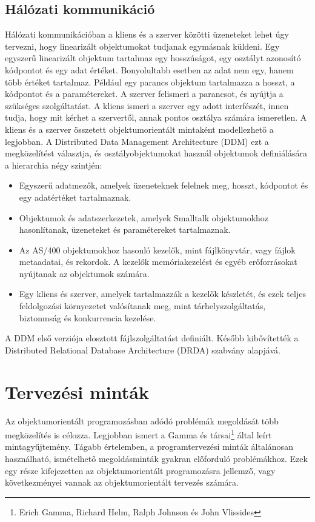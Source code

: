 \documentclass[a4paper,12pt,twoside]{report}
\theoremstyle{definition}
\begin{document}
	\section{Hálózati kommunikáció}
	
	Hálózati kommunikációban a kliens és a szerver közötti üzeneteket lehet úgy tervezni, hogy linearizált objektumokat tudjanak egymásnak küldeni. Egy egyszerű linearizált objektum tartalmaz egy hosszúságot, egy osztályt azonosító kódpontot és egy adat értéket. Bonyolultabb esetben az adat nem egy, hanem több értéket tartalmaz. Például egy parancs objektum tartalmazza a hosszt, a kódpontot és a paramétereket. A szerver felismeri a parancsot, és nyújtja a szükséges szolgáltatást. A kliens ismeri a szerver egy adott interfészét, innen tudja, hogy mit kérhet a szervertől, annak pontos osztálya számára ismeretlen. A kliens és a szerver összetett objektumorientált mintaként modellezhető a legjobban. A Distributed Data Management Architecture (DDM) ezt a megközelítést választja, és osztályobjektumokat használ objektumok definiálására a hierarchia négy szintjén:
	
	\begin{itemize}
		\item Egyszerű adatmezők, amelyek üzeneteknek felelnek meg, hosszt, kódpontot és egy adatértéket tartalmaznak.
		\item Objektumok és adatszerkezetek, amelyek Smalltalk objektumokhoz hasonlítanak, üzeneteket és paramétereket tartalmaznak.
		\item Az AS/400 objektumokhoz hasonló kezelők, mint fájlkönyvtár, vagy fájlok metaadatai, és rekordok. A kezelők memóriakezelést és egyéb erőforrásokat nyújtanak az objektumok számára.
		\item Egy kliens és szerver, amelyek tartalmazzák a kezelők készletét, és ezek teljes feldolgozási környezetet valósítanak meg, mint tárhelyszolgáltatás, biztonmság és konkurrencia kezelése.
	\end{itemize}

	A DDM első verziója elosztott fájlszolgáltatást definiált. Később kibővítették a Distributed Relational Database Architecture (DRDA) szabvány alapjává.
	
	\chapter{Tervezési minták}\label{fejezet-tmintak}
	
	Az objektumorientált programozásban adódó problémák megoldását több megközelítés is célozza. Legjobban ismert a Gamma és társai\footnote{Erich Gamma, Richard Helm, Ralph Johnson és John Vlissides} által leírt mintagyűjtemény. Tágabb értelemben, a programtervezési minták általánosan használható, ismételhető megoldásminták gyakran előforduló problémákhoz. Ezek egy része kifejezetten az objektumorientált programozásra jellemző, vagy következményei vannak az objektumorientált tervezés számára.
	
\end{document}
